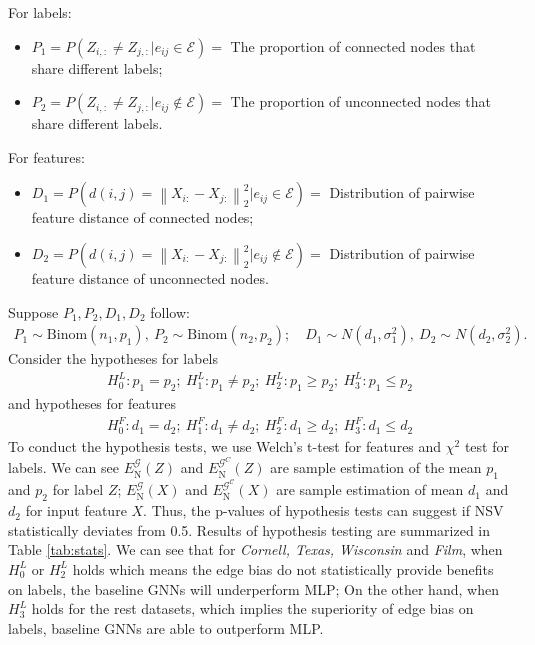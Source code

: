 \documentclass{article}
\newcommand{\norm}[1]{\left\lVert#1\right\rVert}
\newcommand{\0}{{\boldsymbol{0}}}
\newcommand{\6}{{\partial}}
\newcommand{\8}{{\infty}}
\newcommand{\4}{{\nabla}}
\providecommand{\norm}[1]{\lVert#1\rVert}
\begin{document}
For labels: 
\begin{itemize}
    \item $P_1=P\left(Z_{i,:} \neq Z_{j,:} \big| e_{ij} \in \mathcal{E} \right)=$ The proportion of connected nodes that share different labels;
    \item $P_2=P\left(Z_{i,:} \neq Z_{j,:} \big| e_{ij} \not\in \mathcal{E} \right)=$ The proportion of unconnected nodes that share different labels.
\end{itemize}
For features: 
\begin{itemize}
    \item $D_1=P\left(d(i,j)=\norm{X_{i:}-X_{j:}}_2^2 \big| e_{ij} \in \mathcal{E} \right)=$ Distribution of pairwise feature distance of connected nodes;
    \item $D_2=P\left(d(i,j)=\norm{X_{i:}-X_{j:}}_2^2 \big| e_{ij} \not\in \mathcal{E} \right)=$ Distribution of pairwise feature distance of unconnected nodes.
\end{itemize}
Suppose $P_1, P_2, D_1, D_2$ follow:
\begin{align*}
P_1 \sim \text{Binom}(n_1,p_1),\ P_2 \sim \text{Binom}(n_2,p_2); \quad D_1 \sim N(d_1,\sigma_1^2),\ D_2 \sim N(d_2,\sigma_2^2).
\end{align*}
Consider the hypotheses for labels
\begin{align*}
    H_0^{L}: p_1=p_2; \ H_1^L: p_1\neq p_2;\ H_2^L: p_1 \geq p_2; \ H_3^L: p_1 \leq p_2
\end{align*}
and hypotheses for features
\begin{align*}
    H_0^{F}: d_1=d_2; \ H_1^F: d_1\neq d_2;\ H_2^F: d_1 \geq d_2; \ H_3^F: d_1 \leq d_2
\end{align*}
To conduct the hypothesis tests, we use Welch's t-test for features and $\chi^2$ test for labels. We can see $E_{\text{N}}^\mathcal{G}({Z})$ and $E_{\text{N}}^{\mathcal{G}^C}({Z})$ are sample estimation of the mean $p_1$ and $p_2$ for label $Z$; $E_{\text{N}}^\mathcal{G}({X})$ and $E_{\text{N}}^\mathcal{G^C}({X})$ are sample estimation of mean $d_1$ and $d_2$ for input feature $X$. Thus, the p-values of hypothesis tests can suggest if NSV statistically deviates from 0.5.  Results of hypothesis testing are summarized in Table \ref{tab:stats}. We can see that for \textit{Cornell, Texas, Wisconsin} and \textit{Film}, when $H_0^L$ or $H_2^L$ holds which means the edge bias do not statistically provide benefits on labels, the baseline GNNs will underperform MLP; On the other hand, when $H_3^L$ holds for the rest datasets, which implies the superiority of edge bias on labels, baseline GNNs are able to outperform MLP.
\end{document}
